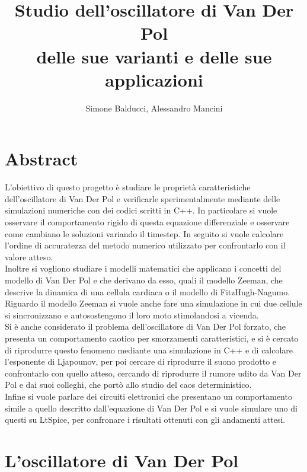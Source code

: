 \documentclass[12pt]{article}
\title{Studio dell'oscillatore di Van Der Pol \\
	delle sue varianti e delle sue applicazioni}
\author{Simone Balducci, Alessandro Mancini}
\date{}
\begin{document}
\maketitle 
\section{Abstract}
L'obiettivo di questo progetto è studiare le proprietà caratteristiche dell'oscillatore di Van Der Pol e verificarle sperimentalmente mediante delle simulazioni numeriche con dei codici scritti in C++. In particolare si vuole osservare il comportamento rigido di questa equazione differenziale e osservare come cambiano le soluzioni variando il timestep. In seguito si vuole calcolare l'ordine di accuratezza del metodo numerico utilizzato per confrontarlo con il valore atteso. \\
Inoltre si vogliono studiare i modelli matematici che applicano i concetti del modello di Van Der Pol e che derivano da esso, quali il modello Zeeman, che descrive la dinamica di una cellula cardiaca o il modello di FitzHugh-Nagumo. Riguardo il modello Zeeman si vuole anche fare una simulazione in cui due cellule si sincronizzano e autosostengono il loro moto stimolandosi a vicenda. \\
Si è anche considerato il problema dell'oscillatore di Van Der Pol forzato, che presenta un comportamento caotico per smorzamenti caratteristici, e si è cercato di riprodurre questo fenomeno mediante una simulazione in C++ e di calcolare l'esponente di Ljapounov, per poi cercare di riprodurre il suono prodotto e confrontarlo con quello atteso, cercando di riprodurre il rumore udito da Van Der Pol e dai suoi colleghi, che portò allo studio del caos deterministico. \\
Infine si vuole parlare dei circuiti elettronici che presentano un comportamento simile a quello descritto dall'equazione di Van Der Pol e si vuole simulare uno di questi su LtSpice, per confronare i risultati ottenuti con gli andamenti attesi.
\section{L'oscillatore di Van Der Pol}
\end{document}
